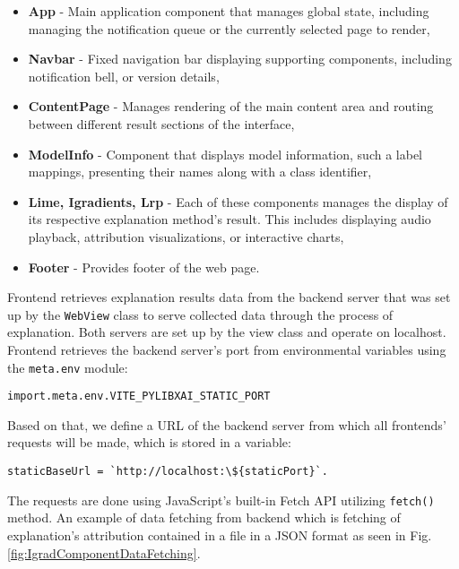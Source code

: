 \documentclass[
    bindingoffset=5mm,  %
    footnoteindent=3mm, %
    hyphenation=true    %
]{src/wut-thesis}
\begin{document}
\begin{itemize}[itemsep=1\baselineskip]
	\item \textbf{App} - Main application component that manages global state,
        including managing the notification queue or the currently selected page to render,
    \item \textbf{Navbar} - Fixed navigation bar displaying supporting components,
        including notification bell, or version details,
    \item \textbf{ContentPage} - Manages rendering of the main content area and
        routing between different result sections of the interface,
    \item \textbf{ModelInfo} - Component that displays model information,
        such a label mappings, presenting their names along with a class identifier,
    \item \textbf{Lime, Igradients, Lrp} - Each of these components manages the display of its
        respective explanation method’s result. This includes displaying audio playback,
        attribution visualizations, or interactive charts,
    \item \textbf{Footer} - Provides footer of the web page.
\end{itemize}

Frontend retrieves explanation results data from the backend server that was set up by the
\texttt{WebView} class to serve collected data through the process of explanation.
Both servers are set up by the view class and operate on localhost. 
Frontend retrieves the backend server's port from environmental variables using the \texttt{meta.env}
module:
\begin{verbatim}
import.meta.env.VITE_PYLIBXAI_STATIC_PORT
\end{verbatim}

Based on that, we define a URL of the backend server from which all frontends’ requests
will be made, which is stored in a variable:
\begin{verbatim}
staticBaseUrl = `http://localhost:\${staticPort}`.
\end{verbatim}
The requests are done using JavaScript's built-in Fetch API utilizing \texttt{fetch()} method.
An example of data fetching from backend which is fetching of explanation's attribution
contained in a file in a JSON format as seen in Fig. \ref{fig:IgradComponentDataFetching}.
\end{document}
